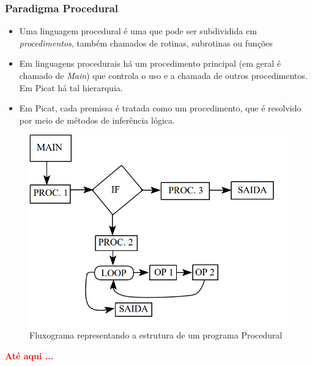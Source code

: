 \begin{frame}[fragile]
	\frametitle{Paradigma Procedural}
    
    \begin{itemize}
    
    	\item Uma linguagem procedural é uma que pode ser subdividida em \textit{procedimentos},
        também chamados de rotinas, subrotinas ou funções
        
        \pause
        \item Em linguagens procedurais há um procedimento principal (em geral é chamado de 
        \textit{Main}) que controla o uso e a chamada de outros procedimentos. Em Picat há
        tal hierarquia.
        
        \pause
        \item Em Picat, cada premissa é tratada como um procedimento, que é resolvido por meio
        de métodos de inferência lógica.
       
    \end{itemize}
    
\framebreak
    
    \begin{figure}
    	\begin{columns}
	         \includegraphics[width=.8\textwidth] {figures/Paradigma_Procedural.png}
             \caption{Fluxograma representando a estrutura de um programa Procedural}
	         \label{Fluxograma Procedural}
		\end{columns}
	\end{figure}

\textbf{\textcolor{red}{Até aqui ...}}    
\end{frame}


